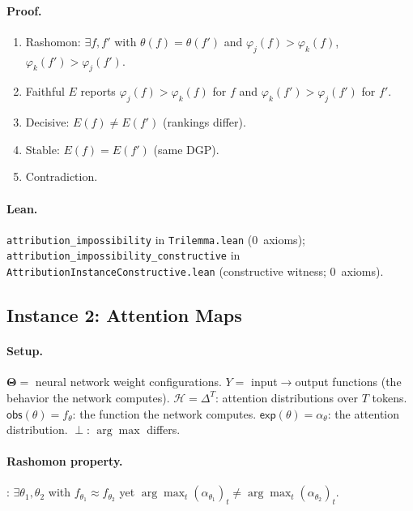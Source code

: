 \documentclass[11pt,a4paper]{article}
\newcommand{\Params}{\mathbf{\Theta}}
\newcommand{\sH}{\mathcal{H}}
\newcommand{\incomp}{\perp}
\begin{document}
\paragraph{Proof.}
\begin{enumerate}[nosep]
  \item Rashomon: $\exists f, f'$ with $\theta(f) = \theta(f')$ and
    $\varphi_j(f) > \varphi_k(f)$, $\varphi_k(f') > \varphi_j(f')$.
  \item Faithful $E$ reports $\varphi_j(f) > \varphi_k(f)$ for $f$ and
    $\varphi_k(f') > \varphi_j(f')$ for $f'$.
  \item Decisive: $E(f) \neq E(f')$ (rankings differ).
  \item Stable: $E(f) = E(f')$ (same DGP).
  \item Contradiction.
\end{enumerate}

\paragraph{Lean.}
{\raggedright
\texttt{attribution\_impossibility} in \texttt{Trilemma.lean}
(0~axioms);
\texttt{attribution\_impossibility\_constructive} in
\texttt{AttributionInstanceConstructive.lean}
(constructive witness; 0~axioms).\par}

\subsection{Instance 2: Attention Maps}
\label{app:proof-attention}

\paragraph{Setup.}
$\Params ={}$ neural network weight configurations.
$Y ={}$ input$\to$output functions (the behavior the network computes).
$\sH = \Delta^T$: attention distributions over $T$ tokens.
$\mathsf{obs}(\theta) = f_\theta$: the function the network computes.
$\mathsf{exp}(\theta) = \alpha_\theta$: the attention distribution.
$\incomp$: $\arg\max$ differs.

\paragraph{Rashomon property.}
\citet{damour2022underspecification}: $\exists \theta_1, \theta_2$ with
$f_{\theta_1} \approx f_{\theta_2}$ yet
$\arg\max_t (\alpha_{\theta_1})_t \neq \arg\max_t (\alpha_{\theta_2})_t$.
\end{document}
